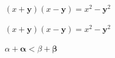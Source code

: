 \documentclass[a4paper]{article}
\begin{document}
	$(x + \mathbf{y})(x - \mathbf{y}) = x^{2} - \mathbf{y}^{2}$
	
	$(x + \bm{y})(x - \bm{y}) = x^{2} - \bm{y}^{2}$
	
	$\alpha + \bm{\alpha} < \beta + \bm{\beta}$
\end{document}
